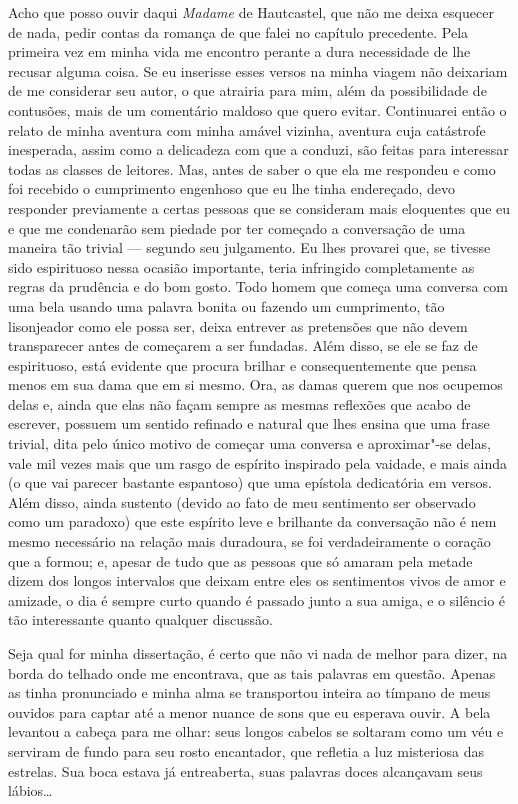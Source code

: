  Acho que posso ouvir daqui \textit{Madame} de Hautcastel, que não me
deixa esquecer de nada, pedir contas da romança de que falei no
capítulo precedente. Pela primeira vez em minha vida me encontro
perante a dura necessidade de lhe recusar alguma coisa. Se eu inserisse
esses versos na minha viagem não deixariam de me considerar seu autor,
o que atrairia para mim, além da possibilidade de contusões, mais de
um comentário maldoso que quero evitar. Continuarei então o relato de
minha aventura com minha amável vizinha, aventura cuja catástrofe
inesperada, assim como a delicadeza com que a conduzi, são feitas para
interessar todas as classes de leitores. Mas, antes de saber o que ela
me respondeu e como foi recebido o cumprimento engenhoso que eu lhe
tinha endereçado, devo responder previamente a certas pessoas que se
consideram mais eloquentes que eu e que me condenarão sem piedade por
ter começado a conversação de uma maneira tão trivial --- segundo seu
julgamento. Eu lhes provarei que, se tivesse sido espirituoso nessa
ocasião importante, teria infringido completamente as regras da
prudência e do bom gosto. Todo homem que começa uma conversa com uma
bela usando uma palavra bonita ou fazendo um cumprimento, tão
lisonjeador como ele possa ser, deixa entrever as pretensões que não
devem transparecer antes de começarem a ser fundadas. Além disso, se
ele se faz de espirituoso, está evidente que procura brilhar e
consequentemente que pensa menos em sua dama que em si mesmo. Ora, as
damas querem que nos ocupemos delas e, ainda que elas não façam sempre
as mesmas reflexões que acabo de escrever, possuem um sentido refinado
e natural que lhes ensina que uma frase trivial, dita pelo único motivo
de começar uma conversa e aproximar"-se delas, vale mil vezes mais que
um rasgo de espírito inspirado pela vaidade, e mais ainda (o que vai
parecer bastante espantoso) que uma epístola dedicatória em versos.
Além disso, ainda sustento (devido ao fato de meu sentimento ser
observado como um paradoxo) que este espírito leve e brilhante da
conversação não é nem mesmo necessário na relação mais duradoura, se
foi verdadeiramente o coração que a formou; e, apesar de tudo que as
pessoas que só amaram pela metade dizem dos longos intervalos que
deixam entre eles os sentimentos vivos de amor e amizade, o dia é
sempre curto quando é passado junto a sua amiga, e o silêncio é tão
interessante quanto qualquer discussão. 

 Seja qual for minha dissertação, é certo que não vi nada de melhor para
dizer, na borda do telhado onde me encontrava, que as tais palavras em
questão. Apenas as tinha pronunciado e minha alma se transportou
inteira ao tímpano de meus ouvidos para captar até a menor nuance de
sons que eu esperava ouvir. A bela levantou a cabeça para me olhar:
seus longos cabelos se soltaram como um véu e serviram de fundo para
seu rosto encantador, que refletia a luz misteriosa das estrelas. Sua
boca estava já entreaberta, suas palavras doces alcançavam seus
lábios\ldots

